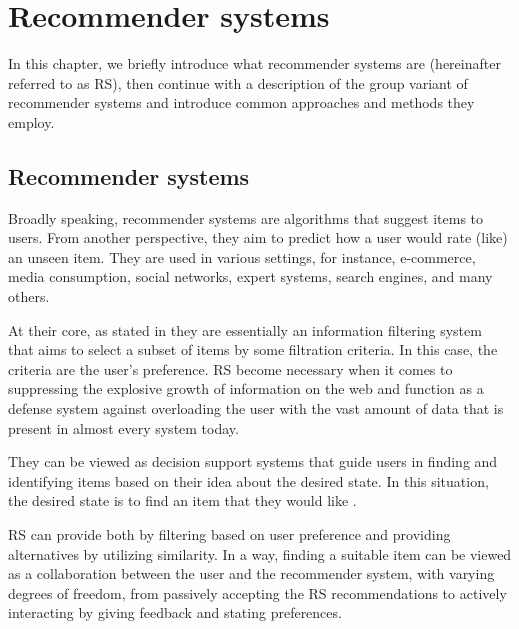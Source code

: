
\chapter{Recommender systems} \label{chap:recommender_systems}
In this chapter, we briefly introduce what recommender systems are (hereinafter referred to as RS), then continue with a description of the group variant of recommender systems and introduce common approaches and methods they employ.


\section{Recommender systems}\label{sec:01_rec_sys}
Broadly speaking, recommender systems are algorithms that suggest items to users. From another perspective, they aim to predict how a user would rate (like) an unseen item. They are used in various settings, for instance, e-commerce, media consumption, social networks, expert systems, search engines, and many others.

At their core, as stated in \cite{wiki:Recommender_system} they are essentially an information filtering system that aims to select a subset of items by some filtration criteria. In this case, the criteria are the user's preference. RS become necessary when it comes to suppressing the explosive growth of information on the web and function as a defense system against overloading the user with the vast amount of data that is present in almost every system today.

They can be viewed as decision support systems that guide users in finding and identifying items based on their idea about the desired state. In this situation, the desired state is to find an item that they would like \cite{grouprecommendersystems_felfernig2018group}.
 
RS can provide both by filtering based on user preference and providing alternatives by utilizing similarity. In a way, finding a suitable item can be viewed as a collaboration between the user and the recommender system, with varying degrees of freedom, from passively accepting the RS recommendations to actively interacting by giving feedback and stating preferences.

